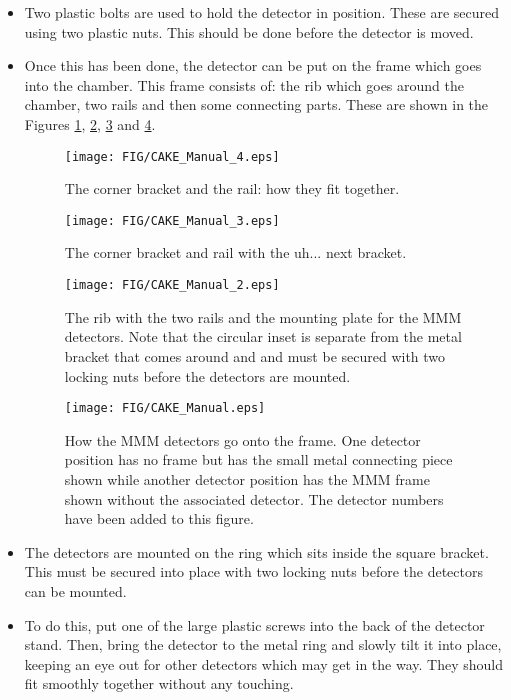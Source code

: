 \documentclass[11pt]{report}
\begin{document}
\begin{itemize}
\item Two plastic bolts are used to hold the detector in position. These are secured using two plastic nuts. This should be done before the detector is moved.

\item Once this has been done, the detector can be put on the frame which goes into the chamber. This frame consists of: the rib which goes around the chamber, two rails and then some connecting parts. These are shown in the Figures \ref{fig:CAKE_bracket_1}, \ref{fig:CAKE_bracket_2}, \ref{fig:CAKE_bracket_3} and \ref{fig:CAKE_whole_frame}.

\begin{figure}
 \texttt{[image: FIG/CAKE\_Manual\_4.eps]}
 \caption{The corner bracket and the rail: how they fit together.}
 \label{fig:CAKE_bracket_1}
\end{figure}

\begin{figure}
 \texttt{[image: FIG/CAKE\_Manual\_3.eps]}
 \caption{The corner bracket and rail with the uh... next bracket.}
 \label{fig:CAKE_bracket_2}
\end{figure}

\begin{figure}
 \texttt{[image: FIG/CAKE\_Manual\_2.eps]}
 \caption{The rib with the two rails and the mounting plate for the MMM detectors. Note that the circular inset is separate from the metal bracket that comes around and and must be secured with two locking nuts before the detectors are mounted.}
 \label{fig:CAKE_bracket_3}
\end{figure}

\begin{figure}
 \texttt{[image: FIG/CAKE\_Manual.eps]}
 \caption{How the MMM detectors go onto the frame. One detector position has no frame but has the small metal connecting piece shown while another detector position has the MMM frame shown without the associated detector. The detector numbers have been added to this figure.}
 \label{fig:CAKE_whole_frame}
\end{figure}


\item The detectors are mounted on the ring which sits inside the square bracket. This must be secured into place with two locking nuts before the detectors can be mounted.

\item To do this, put one of the large plastic screws into the back of the detector stand. Then, bring the detector to the metal ring and slowly tilt it into place, keeping an eye out for other detectors which may get in the way. They should fit smoothly together without any touching.


\end{itemize}
\end{document}
